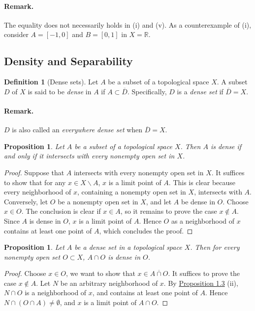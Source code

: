 \documentclass{article}
\numberwithin{equation}{section}
\theoremstyle{plain}
\newtheorem{proposition}[theorem]{Proposition}
\theoremstyle{definition}
\newtheorem{definition}[theorem]{Definition}
\begin{document}
\paragraph{Remark.} The equality does not necessarily holds in (i) and (v). As a counterexample of (i), consider $A=[-1,0]$ and $B=[0,1]$ in $X=\mathbb{R}$.

\subsection{Density and Separability}
\begin{definition}[Dense sets]\label{def:1.14} Let $A$ be a subset of a topological space $X$. A subset $D$ of $X$ is said to be \textit{dense} in $A$ if $A\subset\overline{D}$. Specifically, $D$ is a \textit{dense set} if $\overline{D}=X$. 
\end{definition}

\paragraph{Remark.} $D$ is also called an \textit{everywhere dense set} when $\overline{D} = X$.

\begin{proposition}\label{prop:1.15} Let $A$ be a subset of a topological space $X$. Then $A$ is dense if and only if it intersects with every nonempty open set in $X$.
\end{proposition}
\begin{proof}
Suppose that $A$ intersects with every nonempty open set in $X$. It suffices to show that for any $x\in X\backslash A$, $x$ is a limit point of $A$. This is clear because every neighborhood of $x$, containing a nonempty open set in $X$, intersects with $A$. Conversely, let $O$ be a nonempty open set in $X$, and let $A$ be dense in $O$. Choose $x\in O$. The conclusion is clear if $x\in A$, so it remains to prove the case $x\notin A$. Since $A$ is dense in $O$, $x$ is a limit point of $A$. Hence $O$ as a neighborhood of $x$ contains at least one point of $A$, which concludes the proof.
\end{proof}

\begin{proposition}\label{prop:1.16} Let $A$ be a dense set in a topological space $X$. Then for every nonempty open set $O\subset X$, $A\cap O$ is dense in $O$.
\end{proposition}
\begin{proof}
Choose $x\in O$, we want to show that $x\in\overline{A\cap O}$. It suffices to prove the case $x\notin A$. Let $N$ be an arbitrary neighborhood of $x$. By \hyperref[prop:1.3]{Proposition 1.3} (ii), $N\cap O$ is a neighborhood of $x$, and contains at least one point of $A$. Hence $N \cap (O\cap A)\neq\emptyset$, and $x$ is a limit point of $A\cap O$.
\end{proof}
\end{document}
